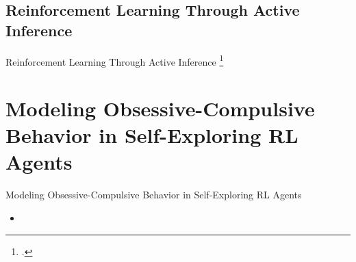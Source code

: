 \documentclass[t,aspectratio=169,xcolor=dvipsnames]{beamer}
\newcommand\blfootcitetext[1]{%
  \begingroup
  \renewcommand\thefootnote{}\footcitetext{#1}%
  \addtocounter{footnote}{-1}%
  \endgroup
}
\newcommand{\citec}[1]{\hfill\textcolor{lightgray}{\citep{#1}}}
\newcommand{\cname}[2]{\texorpdfstring{#1 \citec{#2}}{#1}}
\begin{document}
\subsection{\cname{Reinforcement Learning Through Active Inference}{tschantz2020reinforcement}}
\begin{frame}{Reinforcement Learning Through Active Inference}
    \blfootcitetext{tschantz2020reinforcement}
    
\end{frame}
    

\section{Modeling Obsessive-Compulsive Behavior in Self-Exploring RL Agents} %
\begin{frame}{Modeling Obsessive-Compulsive Behavior in Self-Exploring RL Agents}
    \begin{itemize}
        \item[] 
    \end{itemize}
\end{frame}
\end{document}
